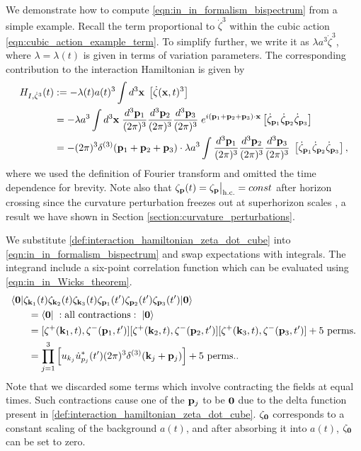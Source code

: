 We demonstrate how to compute \eqref{eqn:in_in_formalism_bispectrum} from a simple example. Recall the term proportional to $\dot\zeta^3$ within the cubic action \eqref{eqn:cubic_action_example_term}. To simplify further, we write it as $\lambda a^3 \dot{\zeta}^3$, where $\lambda=\lambda(t)$ is given in terms of variation parameters. The corresponding contribution to the interaction Hamiltonian is given by
\begin{align}
	H_{I,\dot{\zeta}^3}(t) &:= -\lambda(t) a(t)^3 \int d^3\mathbf{x} \; \left[  \dot{\zeta}(\mathbf{x},t)^3 \right]  \\
	&= -\lambda a^3 \int d^3\mathbf{x} \; \frac{d^3\mathbf{p}_1}{(2\pi)^3} \frac{d^3\mathbf{p}_2}{(2\pi)^3} \frac{d^3\mathbf{p}_3}{(2\pi)^3} \; e^{i(\mathbf{p}_1 + \mathbf{p}_2 + \mathbf{p}_3)\cdot\mathbf{x}} \left[ \dot{\zeta}_{\mathbf{p}_1} \dot{\zeta}_{\mathbf{p}_2} \dot{\zeta}_{\mathbf{p}_3} \right] \\
	&= - (2\pi)^3 \delta^{(3)}(\mathbf{p}_1 + \mathbf{p}_2 + \mathbf{p}_3) \cdot \lambda a^3 \int \frac{d^3\mathbf{p}_1}{(2\pi)^3} \frac{d^3\mathbf{p}_2}{(2\pi)^3} \frac{d^3\mathbf{p}_3}{(2\pi)^3} \; \left[ \dot{\zeta}_{\mathbf{p}_1} \dot{\zeta}_{\mathbf{p}_2} \dot{\zeta}_{\mathbf{p}_3} \right], \label{def:interaction_hamiltonian_zeta_dot_cube}
\end{align}
where we used the definition of Fourier transform and omitted the time dependence for brevity. Note also that $\zeta_{\mathbf{p}}(t) = \zeta_{\mathbf{p}}\bigr|_ \text{h.c.} = const$ after horizon crossing since the curvature perturbation freezes out at superhorizon scales , a result we have shown in Section \ref{section:curvature_perturbations}.

We substitute \eqref{def:interaction_hamiltonian_zeta_dot_cube} into \eqref{eqn:in_in_formalism_bispectrum} and swap expectations with integrals. The integrand include a six-point correlation function which can be evaluated using \eqref{eqn:in_in_Wicks_theorem}.
\begin{align}
	&\langle\vv{0}| \zeta_{\vv{k}_1}(t) \zeta_{\vv{k}_2}(t) \zeta_{\vv{k}_3}(t) \zeta_{\vv{p}_1}(t') \zeta_{\vv{p}_2}(t') \zeta_{\vv{p}_3}(t') |\vv{0}\rangle \nonumber\\
	&\hspace{0.05\textwidth}= \langle\vv{0}| \;: \text{all contractions} :\;|\vv{0}\rangle \\
	&\hspace{0.05\textwidth}= [ \zeta^+(\vv{k}_1,t) , \zeta^-(\vv{p}_1,t') ] [ \zeta^+(\vv{k}_2,t) , \zeta^-(\vv{p}_2,t') ] [ \zeta^+(\vv{k}_3,t) , \zeta^-(\vv{p}_3,t') ] + \text{5 perms.}  \\
	&\hspace{0.05\textwidth}=  \prod_{j=1}^{3} \left[ u_{k_j} \dot{u}^*_{p_j}(t') (2\pi)^3 \delta^{(3)}(\vv{k}_j+\vv{p}_j) \right] + \text{5 perms.}.
\end{align}
Note that we discarded some terms which involve contracting the fields at equal times. Such contractions cause one of the $\mathbf{p}_j$ to be $\mathbf{0}$ due to the delta function present in \eqref{def:interaction_hamiltonian_zeta_dot_cube}. $\zeta_\mathbf{0}$ corresponds to a constant scaling of the background $a(t)$, and after absorbing it into $a(t)$, $\zeta_{\mathbf{0}}$ can be set to zero. 

